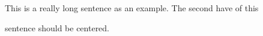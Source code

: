 \documentclass{article}
\begin{document}
This is a really long sentence as an example.  The second have of this\\
\centerline{sentence should be centered.}
\end{document}
